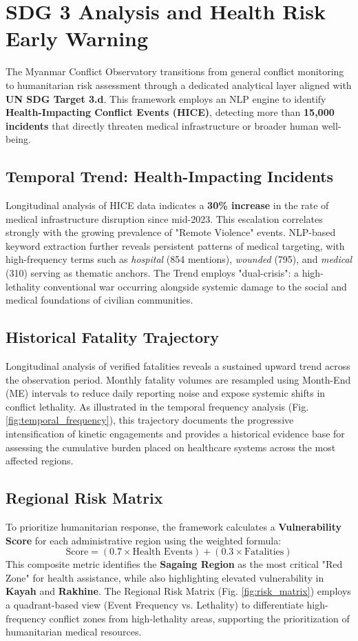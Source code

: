 \documentclass[conference]{IEEEtran}
\begin{document}
\section{SDG 3 Analysis and Health Risk Early Warning}

The Myanmar Conflict Observatory transitions from general conflict monitoring to humanitarian risk assessment through a dedicated analytical layer aligned with \textbf{UN SDG Target 3.d}. This framework employs an NLP engine to identify \textbf{Health-Impacting Conflict Events (HICE)}, detecting more than \textbf{15,000 incidents} that directly threaten medical infrastructure or broader human well-being.

\subsection{Temporal Trend: Health-Impacting Incidents}
Longitudinal analysis of HICE data indicates a \textbf{30\% increase} in the rate of medical infrastructure disruption since mid-2023. This escalation correlates strongly with the growing prevalence of "Remote Violence" events. NLP-based keyword extraction further reveals persistent patterns of medical targeting, with high-frequency terms such as \textit{hospital} (854 mentions), \textit{wounded} (795), and \textit{medical} (310) serving as thematic anchors. The Trend employs "dual-crisis": a high-lethality conventional war occurring alongside systemic damage to the social and medical foundations of civilian communities.

\subsection{Historical Fatality Trajectory}
Longitudinal analysis of verified fatalities reveals a sustained upward trend across the observation period. Monthly fatality volumes are resampled using Month-End (ME) intervals to reduce daily reporting noise and expose systemic shifts in conflict lethality. As illustrated in the temporal frequency analysis (Fig. \ref{fig:temporal_frequency}), this trajectory documents the progressive intensification of kinetic engagements and provides a historical evidence base for assessing the cumulative burden placed on healthcare systems across the most affected regions.

\subsection{Regional Risk Matrix}
To prioritize humanitarian response, the framework calculates a \textbf{Vulnerability Score} for each administrative region using the weighted formula:
\[
\text{Score} = (0.7 \times \text{Health Events}) + (0.3 \times \text{Fatalities})
\]
This composite metric identifies the \textbf{Sagaing Region} as the most critical "Red Zone" for health assistance, while also highlighting elevated vulnerability in \textbf{Kayah} and \textbf{Rakhine}. The Regional Risk Matrix (Fig. \ref{fig:risk_matrix}) employs a quadrant-based view (Event Frequency vs. Lethality) to differentiate high-frequency conflict zones from high-lethality areas, supporting the prioritization of humanitarian medical resources.
\end{document}
